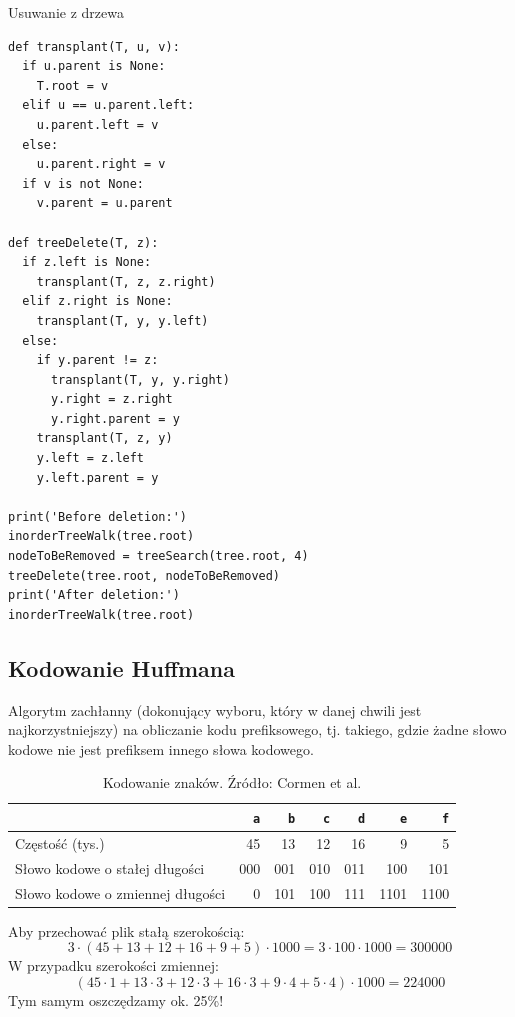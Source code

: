 \documentclass[10pt, oneside]{article}
\theoremstyle{remark}
\begin{document}
Usuwanie z drzewa
\begin{verbatim}
def transplant(T, u, v):
  if u.parent is None:
    T.root = v
  elif u == u.parent.left:
    u.parent.left = v
  else:
    u.parent.right = v
  if v is not None:
    v.parent = u.parent

def treeDelete(T, z):
  if z.left is None:
    transplant(T, z, z.right)
  elif z.right is None:
    transplant(T, y, y.left)
  else:
    if y.parent != z:
      transplant(T, y, y.right)
      y.right = z.right
      y.right.parent = y
    transplant(T, z, y)
    y.left = z.left
    y.left.parent = y
    
print('Before deletion:')
inorderTreeWalk(tree.root)
nodeToBeRemoved = treeSearch(tree.root, 4)
treeDelete(tree.root, nodeToBeRemoved)
print('After deletion:')
inorderTreeWalk(tree.root)
\end{verbatim}

\subsection{Kodowanie Huffmana}
Algorytm zachłanny (dokonujący wyboru, który w danej chwili jest najkorzystniejszy) na obliczanie kodu prefiksowego, tj. takiego, gdzie żadne słowo kodowe nie jest prefiksem innego słowa kodowego.

\begin{table}[htpb]
\caption{Kodowanie znaków. Źródło: Cormen et al.}
\centering
\begin{tabular}{@{}lrrrrrr@{}}
\toprule
 & \texttt{a} & \texttt{b} & \texttt{c} & \texttt{d} & \texttt{e} & \texttt{f} \\ \midrule
Częstość (tys.) & 45 & 13 & 12 & 16 & 9 & 5 \\
Słowo kodowe o stałej długości & 000 & 001 & 010 & 011 & 100 & 101 \\
Słowo kodowe o zmiennej długości & 0 & 101 & 100 & 111 & 1101 & 1100 \\
\bottomrule
\end{tabular}
\end{table}

Aby przechować plik stałą szerokością:
$$ 3 \cdot (45 + 13 + 12 + 16 + 9 + 5) \cdot 1000  =3 \cdot 100 \cdot 1000 = 300000 $$
W przypadku szerokości zmiennej:
$$ (45 \cdot 1 + 13 \cdot 3 + 12 \cdot 3 + 16 \cdot 3 + 9 \cdot 4+ 5 \cdot 4) \cdot 1000 = 224000$$
Tym samym oszczędzamy ok. 25\%!
\end{document}
